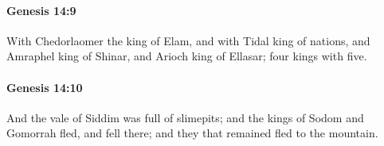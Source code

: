 		\paragraph{Genesis 14:9} %
			\label{GENESIS-14-9}

			With Chedorlaomer the king of Elam, and with Tidal king of nations, and Amraphel king of Shinar, and Arioch king of Ellasar; four kings with five.


		\paragraph{Genesis 14:10} %
			\label{GENESIS-14-10}

			And the vale of Siddim was full of slimepits; and the kings of Sodom and Gomorrah fled, and fell there; and they that remained fled to the mountain.


